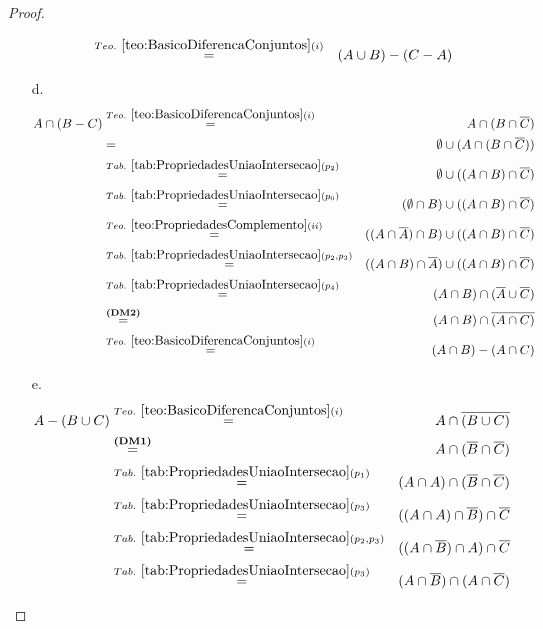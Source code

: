 \begin{proof}
\begin{itemize}
\begin{eqnarray*}
			& \stackrel{Teo. \  \ref{teo:BasicoDiferencaConjuntos}(i)}{=}& (A \cup B) - (C - A)\\
		\end{eqnarray*}
		\item[d.] 
		\begin{eqnarray*}
			A \cap (B - C) & \stackrel{Teo. \  \ref{teo:BasicoDiferencaConjuntos}(i)}{=}& A \cap (B \cap \overline{C})\\
			& = & \emptyset \cup ( A \cap (B \cap \overline{C}))\\
			& \stackrel{Tab. \ \ref{tab:PropriedadesUniaoIntersecao}(p_2)}{=} & \emptyset \cup ( (A \cap B) \cap \overline{C})\\
			& \stackrel{Tab. \ \ref{tab:PropriedadesUniaoIntersecao}(p_6)}{=} & (\emptyset \cap B) \cup ( (A \cap B) \cap \overline{C})\\
			& \stackrel{Teo. \ \ref{teo:PropriedadesComplemento}(ii)}{=} & ((A \cap \overline{A}) \cap B) \cup ( (A \cap B) \cap \overline{C})\\
			& \stackrel{Tab. \ \ref{tab:PropriedadesUniaoIntersecao}(p_2, p_3)}{=} & ((A \cap B) \cap \overline{A}) \cup ( (A \cap B) \cap \overline{C})\\
			& \stackrel{Tab. \ \ref{tab:PropriedadesUniaoIntersecao}(p_4)}{=}& (A \cap B) \cap (\overline{A} \cup \overline{C})\\
			& \stackrel{\textbf{(DM2)}}{=}& (A \cap B) \cap \overline{(A \cap C)}\\
			& \stackrel{Teo. \  \ref{teo:BasicoDiferencaConjuntos}(i)}{=}& (A \cap B) - (A \cap C)
		\end{eqnarray*}
		\item[e.] 
		\begin{eqnarray*}
			A - (B \cup C) & \stackrel{Teo. \  \ref{teo:BasicoDiferencaConjuntos}(i)}{=}& A \cap \overline{(B \cup C)}\\
			& \stackrel{\textbf{(DM1)}}{=}& A \cap (\overline{B} \cap \overline{C})\\
			& \stackrel{Tab. \ \ref{tab:PropriedadesUniaoIntersecao}(p_1)}{=}& (A \cap A) \cap (\overline{B} \cap \overline{C})\\
			& \stackrel{Tab. \ \ref{tab:PropriedadesUniaoIntersecao}(p_3)}{=}& ((A \cap A) \cap \overline{B}) \cap \overline{C}\\
			& \stackrel{Tab. \ \ref{tab:PropriedadesUniaoIntersecao}(p_2, p_3)}{=}& ((A \cap \overline{B}) \cap A) \cap \overline{C}\\
			& \stackrel{Tab. \ \ref{tab:PropriedadesUniaoIntersecao}(p_3)}{=}& (A \cap \overline{B}) \cap (A \cap \overline{C})\\

\end{eqnarray*}
\end{itemize}
\end{proof}
